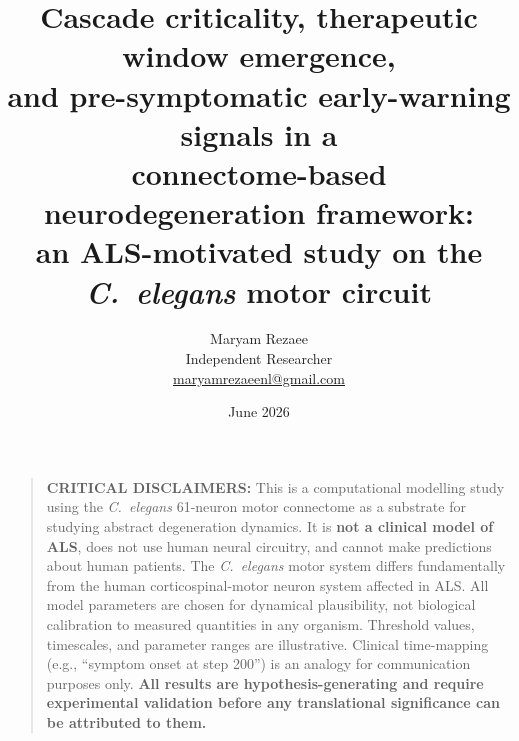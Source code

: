 \documentclass[12pt,a4paper]{article}
\title{Cascade criticality, therapeutic window emergence,\\
and pre-symptomatic early-warning signals in a\\
connectome-based neurodegeneration framework:\\
an ALS-motivated study on the \textit{C.~elegans} motor circuit}
\author{Maryam Rezaee\\
\small Independent Researcher\\
\small \href{mailto:maryamrezaeenl@gmail.com}{maryamrezaeenl@gmail.com}}
\date{June 2026}
\begin{document}
\maketitle

\begin{quote}
\textbf{CRITICAL DISCLAIMERS:} This is a computational modelling study using the
\textit{C.~elegans} 61-neuron motor connectome as a substrate for studying abstract
degeneration dynamics. It is \textbf{not a clinical model of ALS}, does not use human neural
circuitry, and cannot make predictions about human patients. The \textit{C.~elegans} motor
system differs fundamentally from the human corticospinal-motor neuron system affected in ALS.
All model parameters are chosen for dynamical plausibility, not biological calibration to
measured quantities in any organism. Threshold values, timescales, and parameter ranges are
illustrative. Clinical time-mapping (e.g., ``symptom onset at step 200'') is an analogy for
communication purposes only. \textbf{All results are hypothesis-generating and require
experimental validation before any translational significance can be attributed to them.}
\end{quote}
\end{document}
